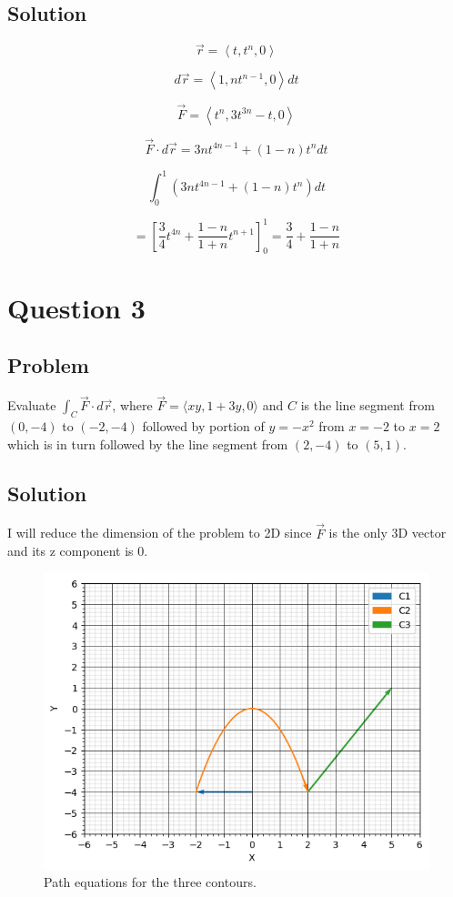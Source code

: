 \documentclass[12pt]{article}
\begin{document}
\subsection{Solution}

\[
    \vec{r} = \left\langle t, t^n, 0\right\rangle
\]

\[
    d \vec{r} = \left\langle 1, n t^{n - 1}, 0\right\rangle d t
\]

\[
    \vec{F} = \left\langle t^n, 3t^{3n} - t, 0\right\rangle
\]

\[
    \vec{F} \cdot d \vec{r} = 3 n t^{4n - 1} + (1 - n) t^n d t
\]

\[
    \int_{0}^{1} \left(3 n t^{4n - 1} + (1 - n) t^n\right) d t
\]

\[
    = {\left[\frac{3}{4} t^{4n} + \frac{1 - n}{1 + n} t^{n + 1}\right]}_{0}^{1}
    = \frac{3}{4} + \frac{1 - n}{1 + n}
\]

\newpage
\section{Question 3}

\subsection{Problem}

Evaluate \(\int_C \vec{F} \cdot d \vec{r}\), where \(\vec{F} = \langle xy, 1 + 3y, 0\rangle \) and
\(C\) is the line segment from \((0, -4)\) to \((-2, -4)\) followed by portion of \(y = -x^2\)
from \(x = -2\) to \(x = 2\) which is in turn followed by the line segment from \((2, -4)\)
to \((5, 1)\).

\subsection{Solution}

I will reduce the dimension of the problem to 2D since \(\vec{F}\) is the
only 3D vector and its z component is 0.

\begin{figure}[H]
    \includegraphics[width=\linewidth]{Q3.png}
    \caption{Path equations for the three contours.\cite{El-Deeb_PEU-218_Assignments_py}}\label{fig:Q3}
\end{figure}
\end{document}
